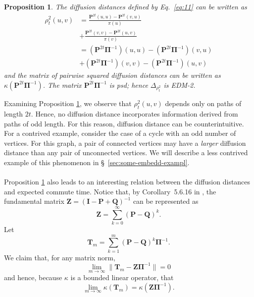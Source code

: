 \documentclass[10pt,twocolumn]{article}
\newtheorem{proposition}[theorem]{Proposition}
\numberwithin{equation}{section}
\begin{document}
\begin{proposition}
  \label{prop:6}
  The diffusion distances defined by Eq.~\eqref{eq:11} can be
  written as
  \begin{equation*}
    \begin{split}
      \rho_{t}^{2}(u,v) &= \frac{\mathbf{P}^{2t}(u,u) -
        \mathbf{P}^{2t}(v,u)}{\pi(u)} \\ &+
      \frac{\mathbf{P}^{2t}(v,v) -
        \mathbf{P}^{2t}(u,v)}{\pi(v)}  \\
      &= (\mathbf{P}^{2t}\bm{\Pi}^{-1})(u,u) -
      (\mathbf{P}^{2t}\bm{\Pi}^{-1})(v,u) \\
      &+ (\mathbf{P}^{2t}\bm{\Pi}^{-1})(v,v) -
      (\mathbf{P}^{2t}\bm{\Pi}^{-1})(u,v)
    \end{split}
  \end{equation*}
  and the matrix of pairwise squared diffusion distances
  can be written as
  $\kappa(\mathbf{P}^{2t}\bm{\Pi}^{-1})$. 
  The matrix $\mathbf{P}^{2t}\bm{\Pi}^{-1}$ is psd; hence
  $\Delta_{\rho_{t}^2}$ is EDM-2.
\end{proposition}
\noindent
Examining Proposition \ref{prop:6}, we observe that $\rho_{t}^{2}(u,v)$
depends only on paths of length $2t$. Hence,
no diffusion distance incorporates information derived from paths of
odd length.  For this reason, diffusion distance can be counterintuitive.
For a contrived example, consider the case of
a cycle with an odd number of vertices. 
For this graph, a pair of connected vertices 
may have a {\em larger}\/ 
diffusion distance than any pair of unconnected vertices.
We will describe a less contrived example of 
this phenomenon in \S~\ref{sec:some-embedd-exampl}.  \\ \\
%
\noindent
Proposition \ref{prop:6} also leads to an interesting relation
between the diffusion distances and expected commute time.
Notice that,
by Corollary~5.6.16 in \cite{horn90:_matrix_analy},
the fundamental matrix
$\mathbf{Z} = (\mathbf{I} - \mathbf{P} + \mathbf{Q})^{-1}$
can be represented as
\[
\mathbf{Z} = \sum_{k=0}^{\infty} \left( \mathbf{P}-\mathbf{Q} \right)^k.
\]
Let
\[
\mathbf{T}_{m} = \sum_{k=1}^m 
\left( \mathbf{P} - \mathbf{Q} \right)^k \bm{\Pi}^{-1}.
\]
We claim that, for any matrix norm,
\begin{equation}
\label{eq:kappaTm}
\lim_{m \rightarrow \infty} \| \mathbf{T}_m - \mathbf{Z}\bm{\Pi}^{-1} \| = 0
\end{equation}
and hence, because $\kappa$ is a bounded linear operator, that
\begin{equation}
  \label{eq:15}
  \lim_{m \rightarrow \infty}\kappa(\mathbf{T}_m) =
    \kappa(\mathbf{Z}\bm{\Pi}^{-1}).
\end{equation}
\end{document}

